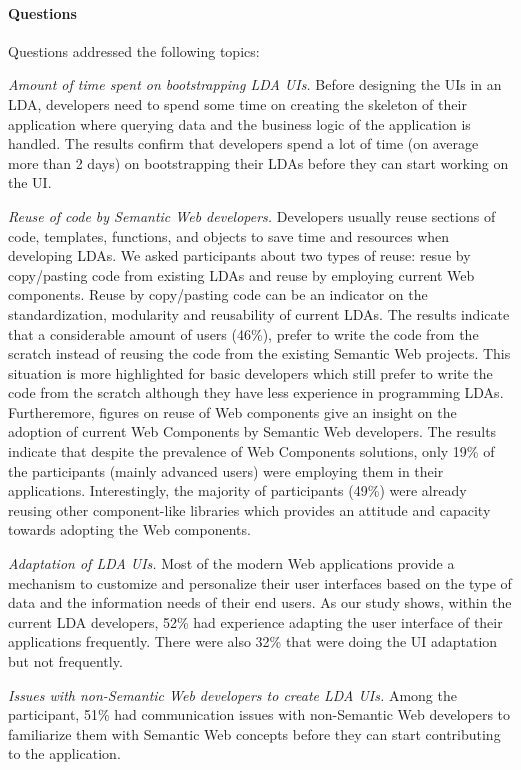 \documentclass{acm_proc_article-sp}
\begin{document}
\paragraph{Questions}
Questions addressed the following topics:
\begin{compactitem}

\item
\emph{Amount of time spent on bootstrapping LDA UIs.}
Before designing the UIs in an LDA, developers need to spend some time on creating the skeleton of their application where querying data and the business logic of the application is handled.
The results confirm that developers spend a lot of time (on average more than 2 days) on bootstrapping their LDAs before they can start working on the UI.
 
\item
\emph{Reuse of code by Semantic Web developers.}
Developers usually reuse sections of code, templates, functions, and objects to save time and resources when developing LDAs.
We asked participants about two types of reuse: resue by copy/pasting code from existing LDAs and reuse by employing current Web components.
Reuse by copy/pasting code can be an indicator on the standardization, modularity and reusability of current LDAs.
The results indicate that a considerable amount of users (46\%), prefer to write the code from the scratch instead of reusing the code from the existing Semantic Web projects.
This situation is more highlighted for basic developers which still prefer to write the code from the scratch although they have less experience in programming LDAs.
Furtheremore, figures on reuse of Web components give an insight on the adoption of current Web Components by Semantic Web developers.
The results indicate that despite the prevalence of Web Components solutions, only 19\% of the participants (mainly advanced users) were employing them in their applications.
Interestingly, the majority of participants (49\%) were already reusing other component-like libraries which provides an attitude and capacity towards adopting the Web components.

\item
\emph{Adaptation of LDA UIs.}
Most of the modern Web applications provide a mechanism to customize and personalize their user interfaces based on the type of data and the information needs of their end users.
As our study shows, within the current LDA developers, 52\% had experience adapting the user interface of their applications frequently. There were also 32\% that were doing the UI adaptation but not frequently.

\item
\emph{Issues with non-Semantic Web developers to create LDA UIs.}
Among the participant, 51\% had communication issues with non-Semantic Web developers to familiarize them with Semantic Web concepts before they can start contributing to the application.

\end{compactitem}
\end{document}
